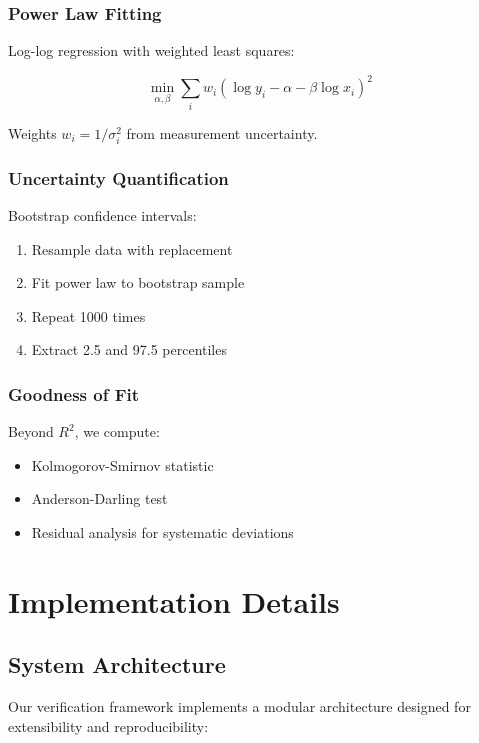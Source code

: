 \documentclass[conference]{IEEEtran}
\begin{document}
\subsubsection{Power Law Fitting}

Log-log regression with weighted least squares:

\begin{equation}
\min_{\alpha, \beta} \sum_{i} w_i(\log y_i - \alpha - \beta \log x_i)^2
\end{equation}

Weights $w_i = 1/\sigma_i^2$ from measurement uncertainty.

\subsubsection{Uncertainty Quantification}

Bootstrap confidence intervals:
\begin{enumerate}
\item Resample data with replacement
\item Fit power law to bootstrap sample
\item Repeat 1000 times
\item Extract 2.5 and 97.5 percentiles
\end{enumerate}

\subsubsection{Goodness of Fit}

Beyond $R^2$, we compute:
\begin{itemize}
\item Kolmogorov-Smirnov statistic
\item Anderson-Darling test
\item Residual analysis for systematic deviations
\end{itemize}

\section{Implementation Details}

\subsection{System Architecture}

Our verification framework implements a modular architecture designed for extensibility and reproducibility:
\end{document}
